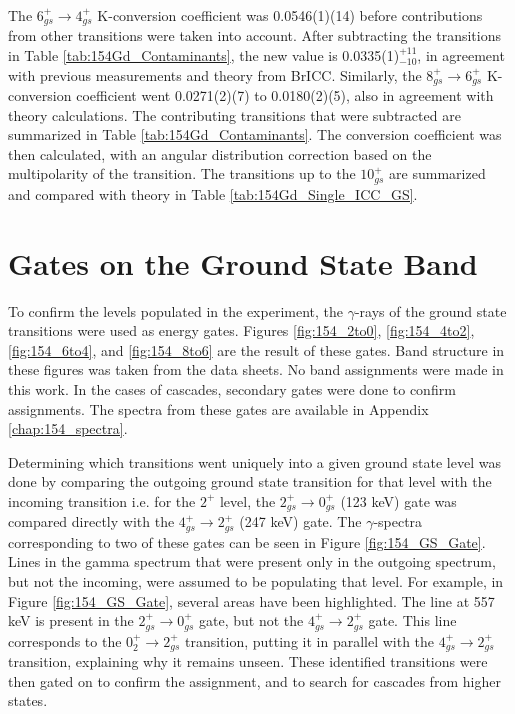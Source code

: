 \afterpage{\clearpage}

The $6_{gs}^+\rightarrow 4_{gs}^+$ K-conversion coefficient was 0.0546(1)(14) before contributions from other transitions were taken into account. After subtracting the transitions in Table \ref{tab:154Gd_Contaminants}, the new value is 0.0335(1)$^{+11}_{-10}$, in agreement with previous measurements and theory from BrICC\citep{kibedi08:_BRICC}. Similarly, the $8_{gs}^+\rightarrow 6_{gs}^+$ K-conversion coefficient went 0.0271(2)(7) to 0.0180(2)(5), also in agreement with theory calculations. The contributing transitions that were subtracted are summarized in Table \ref{tab:154Gd_Contaminants}.  The conversion coefficient was then calculated, with an angular distribution correction based on the multipolarity of the transition. The transitions up to the $10_{gs}^+$ are summarized and compared with theory in Table \ref{tab:154Gd_Single_ICC_GS}.

\afterpage{\clearpage}

\section{Gates on the Ground State Band}
\label{sec:154GS_Gates}

To confirm the levels populated in the experiment, the $\gamma$-rays of the ground state transitions were used as energy gates. Figures \ref{fig:154_2to0}, \ref{fig:154_4to2}, \ref{fig:154_6to4}, and \ref{fig:154_8to6} are the result of these gates. Band structure in these figures was taken from the data sheets\citep{reich09:_nds_154}. No band assignments were made in this work. In the cases of cascades, secondary gates were done to confirm assignments. The spectra from these gates are available in Appendix \ref{chap:154_spectra}.

Determining which transitions went uniquely into a given ground state level was done by comparing the outgoing ground state transition for that level with the incoming transition i.e. for the $2^+$ level, the $2_{gs}^+\rightarrow 0_{gs}^+$ (123 keV) gate was compared directly with the $4_{gs}^+\rightarrow 2_{gs}^+$ (247 keV) gate. The $\gamma$-spectra corresponding to two of these gates can be seen in Figure \ref{fig:154_GS_Gate}. Lines in the gamma spectrum that were present only in the outgoing spectrum, but not the incoming, were assumed to be populating that level. For example, in Figure \ref{fig:154_GS_Gate}, several areas have been highlighted. The line at 557 keV is present in the $2_{gs}^+\rightarrow 0_{gs}^+$ gate, but not the $4_{gs}^+\rightarrow 2_{gs}^+$ gate. This line corresponds to the $0^+_{2}\rightarrow 2^+_{gs}$ transition, putting it in parallel with the $4_{gs}^+\rightarrow 2_{gs}^+$ transition, explaining why it remains unseen. These identified transitions were then gated on to confirm the assignment, and to search for cascades from higher states.

